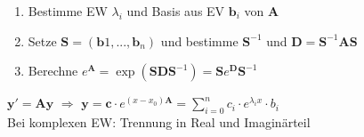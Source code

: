 \documentclass[6pt,a4paper]{scrartcl}
\let\olddot = \dot
\newcommand{\mat}[1]{\ensuremath{\begin{bmatrix} #1 \end{bmatrix}}}								%
\newcommand{\ma}[1]{\ensuremath{\boldsymbol {#1}}}												%
\newcommand{\vect}[1]{\ensuremath{\begin{pmatrix} #1 \end{pmatrix}}}							%
\newcommand{\svdots}{\ensuremath{\olddot :}}													%
\renewcommand{\vec}[1]{\ensuremath{\boldsymbol {#1}}}											%
\renewcommand*{\dot}[1]{\accentset{\mbox{\textrm{\large\bfseries .}} }{#1}}						%
\newcommand{\Ra}[0]{\ensuremath{\Rightarrow}}									%
\newcommand{\ra}[0]{\ensuremath{\rightarrow}} 									%
\newcommand{\R}{\ensuremath{\mathbb R}}
\begin{document}
\begin{multicols*}{4}




\begin{enumerate}
	\item Bestimme EW $\lambda_i$ und Basis aus EV $\vec b_i$ von $\ma A$
	\item Setze $\ma S = (\vec b1, ..., \vec b_n)$ und bestimme $\ma S^{-1}$ und $\ma D = \ma S^{-1} \ma A \ma S$
	\item Berechne $e^{\ma A} = \exp(\ma S \ma D \ma S^{-1}) = \ma S e^{\ma D} \ma S^{-1} $
\end{enumerate}


$\vec y' = \ma A \vec y$ \quad $\Ra$ \quad $\vec y = \vec c \cdot e^{(x-x_0)\ma A} = \sum\limits_{i = 0}^n c_i \cdot e^{\lambda_i x} \cdot b_i$\\

Bei komplexen EW: Trennung in Real und Imaginärteil


\end{multicols*}
\end{document}
